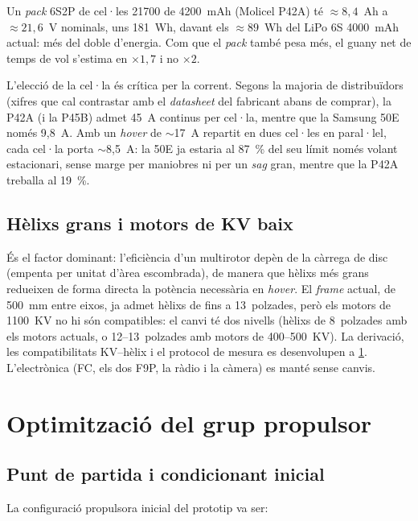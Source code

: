 Un \emph{pack} 6S2P de cel·les 21700 de 4200~mAh (Molicel P42A) té $\approx 8{,}4$~Ah a $\approx 21{,}6$~V nominals, uns 181~Wh, davant els $\approx 89$~Wh del LiPo 6S 4000~mAh actual: més del doble d'energia. Com que el \emph{pack} també pesa més, el guany net de temps de vol s'estima en $\times 1{,}7$ i no $\times 2$.

L'elecció de la cel·la és crítica per la corrent. Segons la majoria de distribuïdors (xifres que cal contrastar amb el \emph{datasheet} del fabricant abans de comprar), la P42A (i la P45B) admet 45~A continus per cel·la, mentre que la Samsung 50E només 9,8~A. Amb un \emph{hover} de $\sim$17~A repartit en dues cel·les en paral·lel, cada cel·la porta $\sim$8,5~A: la 50E ja estaria al 87~\% del seu límit només volant estacionari, sense marge per maniobres ni per un \emph{sag} gran, mentre que la P42A treballa al 19~\%.

\subsection{Hèlixs grans i motors de KV baix}
\label{subsec:autonomia-frame}

És el factor dominant: l'eficiència d'un multirotor depèn de la càrrega de disc (empenta per unitat d'àrea escombrada), de manera que hèlixs més grans redueixen de forma directa la potència necessària en \emph{hover}. El \emph{frame} actual, de 500~mm entre eixos, ja admet hèlixs de fins a 13~polzades, però els motors de 1100~KV no hi són compatibles: el canvi té dos nivells (hèlixs de 8~polzades amb els motors actuals, o 12--13~polzades amb motors de 400--500~KV). La derivació, les compatibilitats KV--hèlix i el protocol de mesura es desenvolupen a \cref{sec:propulsor}. L'electrònica (FC, els dos F9P, la ràdio i la càmera) es manté sense canvis.

\section{Optimització del grup propulsor}
\label{sec:propulsor}

\subsection{Punt de partida i condicionant inicial}
\label{subsec:propulsor-inicial}

La configuració propulsora inicial del prototip va ser:

